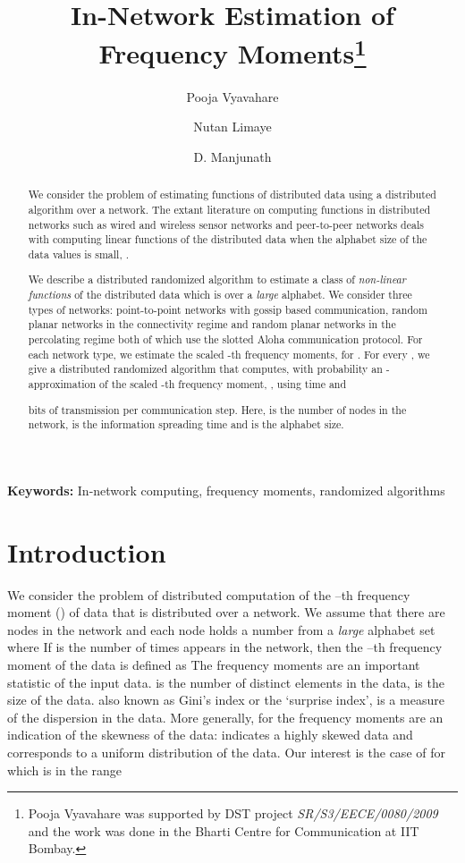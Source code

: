 \documentclass[10pt,twosided,a4paper,draft,onecolumn]{article}
\title{In-Network Estimation of Frequency Moments\footnote{Pooja
    Vyavahare was supported by DST project
    \textit{SR/S3/EECE/0080/2009} and the work was done in the Bharti
    Centre for Communication at IIT Bombay.  }}
\author[1]{Pooja Vyavahare}
\author[2]{Nutan Limaye}
\author[1]{D. Manjunath}
\affil[1]{Department of Electrical Engineering, IIT Bombay\\
\texttt{vpooja,dmanju@ee.iitb.ac.in}
}
\affil[2]{Department of Computer Science and Engineering, IIT Bombay\\
\texttt{nutan@cse.iitb.ac.in}}
\begin{document}
\maketitle



\begin{abstract}
  We consider the problem of estimating functions of distributed data
  using a distributed algorithm over a network.  The extant literature
  on computing functions in distributed networks such as wired and
  wireless sensor networks and peer-to-peer networks deals with
  computing linear functions of the distributed data when the alphabet
  size of the data values is small, .

  We describe a distributed randomized algorithm to estimate a class of
  \emph{non-linear functions} of the distributed data which is over a
  \emph{large} alphabet. We consider three types of networks:
  point-to-point networks with gossip based communication, random
  planar networks in the connectivity regime and random planar
  networks in the percolating regime both of which use the
  slotted Aloha communication protocol. For each network type, we estimate the scaled -th
  frequency moments, for .  For every , we give a distributed randomized algorithm that computes, with
  probability  an -approximation of the scaled
  -th frequency moment, , using time  and 
   
  bits of transmission per communication step.
  Here,  is the number of nodes in the network,  is the
  information spreading time and  is the alphabet size.
 
\end{abstract}
\textbf{Keywords:} In-network computing, frequency moments, randomized
algorithms
  
\section{Introduction}
\label{sec:intro}

We consider the problem of distributed computation of the --th
frequency moment () of data that is distributed over a
network. We assume that there are  nodes in the network and each
node holds a number  from a \textit{large} alphabet set
 where  If  is the
number of times  appears in the network, then the
--th frequency moment of the data is defined as
 The frequency moments are an
important statistic of the input data.  is the number of distinct
elements in the data,  is the size of the data.  also known
as Gini's index or the `surprise index', is a measure of the
dispersion in the data.  More generally, for  the frequency
moments are an indication of the skewness of the data: 
indicates a highly skewed data and  corresponds to
a uniform distribution of the data. Our interest is the case of  for which  is in the range 
\end{document}
